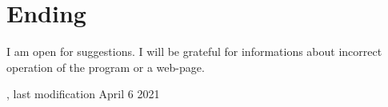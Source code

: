 \documentclass[polish,a4paper,11pt,oneside]{article}
\begin{document}
\section{Ending}

I am open for suggestions. I will be grateful for informations about incorrect operation of the program or a web-page.

{\setlength{\parindent}{0pt}\small{}
, last modification April 6 2021}
\end{document}
